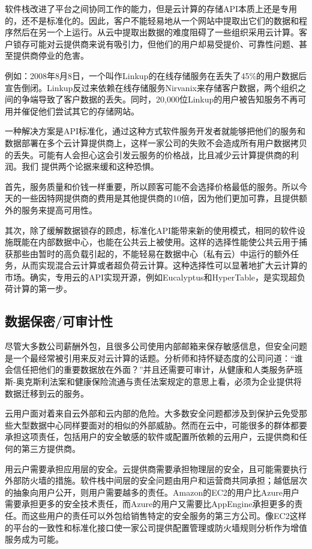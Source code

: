 软件栈改进了平台之间协同工作的能力，但是云计算的存储API本质上还是专用的，还不是标准化的。因此，客户不能轻易地从一个网站中提取出它们的数据和程序然后在另一个上运行。从云中提取出数据的难度阻碍了一些组织采用云计算。客户锁存可能对云提供商来说有吸引力，但他们的用户却易受提价、可靠性问题、甚至提供商停业的危害。

例如：2008年8月8日，一个叫作Linkup的在线存储服务在丢失了45\%的用户数据后宣告倒闭。Linkup反过来依赖在线存储服务Nirvanix来存储客户数据，两个组织之间的争端导致了客户数据的丢失。同时，20,000位Linkup的用户被告知服务不再可用并催促他们尝试其它的存储网站。

一种解决方案是API标准化，通过这种方式软件服务开发者就能够把他们的服务和数据部署在多个云计算提供商上，这样一家公司的失败不会造成所有用户数据拷贝的丢失。可能有人会担心这会引发云服务的价格战，比且减少云计算提供商的利润。我们
提供两个论据来缓和这种恐惧。

首先，服务质量和价钱一样重要，所以顾客可能不会选择价格最低的服务。所以今天的一些因特网提供商的费用是其他提供商的10倍，因为他们更加可靠，且提供额外的服务来提高可用性。

其次，除了缓解数据锁存的顾虑，标准化API能带来新的使用模式，相同的软件设施既能在内部数据中心，也能在公共云上被使用。这样的选择性能使公共云用于捕获那些由暂时的高负载引起的，不能轻易在数据中心（私有云）中运行的额外任务，从而实现混合云计算或者超负荷云计算。这种选择性可以显著地扩大云计算的市场。确实，专用云的API实现开源，例如Eucalyptus和HyperTable，是实现超负荷计算的第一步。

\subsection{数据保密/可审计性}

尽管大多数公司薪酬外包，且很多公司使用内部邮箱来保存敏感信息，但安全问题是一个最经常被引用来反对云计算的话题。分析师和持怀疑态度的公司问道：“谁会信任把他们的重要数据放在外面？”并且还需要可审计，从健康和人类服务萨班斯-奥克斯利法案和健康保险流通与责任法案规定的意思上看，必须为企业提供将数据迁移到云的服务。

云用户面对着来自云外部和云内部的危险。大多数安全问题都涉及到保护云免受那些大型数据中心同样要面对的相似的外部威胁。然而在云中，可能很多的群体都要承担这项责任，包括用户的安全敏感的软件或配置所依赖的云用户，云提供商和任何的第三方提供商。

用云户需要承担应用层的安全。云提供商需要承担物理层的安全，且可能需要执行外部防火墙的措施。软件栈中间层的安全问题由用户和运营商共同承担；越低层次的抽象向用户公开，则用户需要越多的责任。Amazon的EC2的用户比Azure用户需要承担更多的安全技术责任，而Azure的用户又需要比AppEngine承担更多的责任。而这些用户的责任可以外包给销售特定的安全服务的第三方公司。像EC2这样的平台的一致性和标准化接口使一家公司提供配置管理或防火墙规则分析作为增值服务成为可能。

